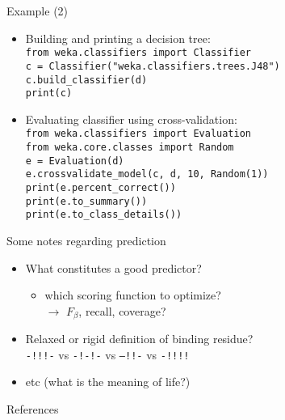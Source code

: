 \documentclass[pdf]
{beamer}
\begin{document}
\begin{frame}{Example (2)}
	\begin{itemize}
		\item Building and printing a decision tree:\\
			\texttt{from weka.classifiers import Classifier}\\
			\texttt{c = Classifier("weka.classifiers.trees.J48")}\\
			\texttt{c.build\_classifier(d)}\\
			\texttt{print(c)}
		\item Evaluating classifier using cross-validation:\\
			\texttt{from weka.classifiers import Evaluation}\\
			\texttt{from weka.core.classes import Random}\\
			\texttt{e = Evaluation(d)}\\
			\texttt{e.crossvalidate\_model(c, d, 10, Random(1))}\\
			\texttt{print(e.percent\_correct())}\\
			\texttt{print(e.to\_summary())}\\
			\texttt{print(e.to\_class\_details())}
	\end{itemize}
\end{frame}

\begin{frame}{Some notes regarding prediction}
	\begin{itemize}
		\item What constitutes a good predictor?\\
		\begin{itemize}
			\item which scoring function to optimize?\\
			$\rightarrow$ $F_\beta$, recall, coverage?
		\end{itemize}
		\item Relaxed or rigid definition of binding residue?\\
			\texttt{-!!!-} vs \texttt{-!-!-} vs \texttt{--!!-} vs \texttt{-!!!!}
		\item etc (what is the meaning of life?)
	\end{itemize}
\end{frame}




\begin{frame}{References}

\end{frame}
\end{document}
